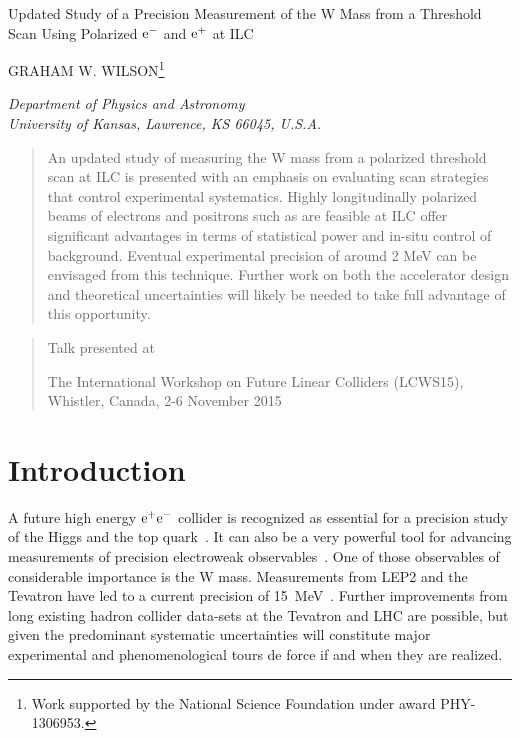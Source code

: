 \documentclass[12pt]{article}
\newcommand\pubnumber{}
\newcommand\pubdate{March 18, 2016}
\def\kansas{Department of Physics and Astronomy\\
University of Kansas, Lawrence, KS 66045, U.S.A.}
\def\support{\footnote{Work supported by the National Science Foundation  
                       under award PHY-1306953.}}
\def\Title#1{\begin{center} {\Large #1 } \end{center}}
\def\Author#1{\begin{center}{ \sc #1} \end{center}}
\def\Address#1{\begin{center}{ \it #1} \end{center}}
\newcommand\pubblock{\rightline{\begin{tabular}{l} \pubnumber\\
         \pubdate  \end{tabular}}}
\newenvironment{Abstract}{\begin{quotation}  }{\end{quotation}}
\newenvironment{Presented}{\begin{quotation} \begin{center} 
             Talk presented at \end{center}\bigskip 
      \begin{center}\begin{large}}{\end{large}\end{center} \end{quotation}}
\begin{document}
\begin{titlepage}
\pubblock

\vfill
\Title{Updated Study of a Precision Measurement of the W Mass from 
a Threshold Scan Using Polarized $\rm{e}^-$ and $\rm{e}^+$ at ILC}
\vfill
\Author{GRAHAM W. WILSON\support}
\Address{\kansas}
\vfill
\begin{Abstract}
An updated study of measuring the W mass from a polarized threshold scan at ILC is presented with
an emphasis on evaluating scan strategies that control experimental systematics.
Highly longitudinally polarized beams of electrons and positrons 
such as are feasible at ILC offer significant advantages in terms of statistical power 
and in-situ control of background.
Eventual experimental precision of around 2 MeV can be envisaged from this technique.
Further work on both the accelerator design and theoretical uncertainties
will likely be needed to take full advantage of this opportunity.
\end{Abstract}
\vfill
\begin{Presented}
The International Workshop on Future Linear Colliders (LCWS15),\\
Whistler, Canada, 2-6 November 2015\\
\end{Presented}
\vfill
\end{titlepage}
\def\thefootnote{\fnsymbol{footnote}}
\setcounter{footnote}{0}
%


\section*{Introduction}

A future high energy $\rm{e}^+\rm{e}^-$ collider is recognized as 
essential for a precision study of the Higgs and the top quark~\cite{Baer:2013cma}. 
It can also be a very powerful tool for advancing 
measurements of precision electroweak 
observables~\cite{Baer:2013cma,Moortgat-Picka:2015yla,Freitas:2013xga,Baak:2013fwa}. 
One of those observables of considerable importance is the W mass. Measurements 
from LEP2 and the Tevatron have led to a current precision of 15~MeV~\cite{PDG-2014}.
Further improvements from long existing hadron collider data-sets at the Tevatron and LHC are possible, 
but given the predominant systematic uncertainties will constitute major experimental 
and phenomenological tours de force if and when they are realized.
\end{document}

